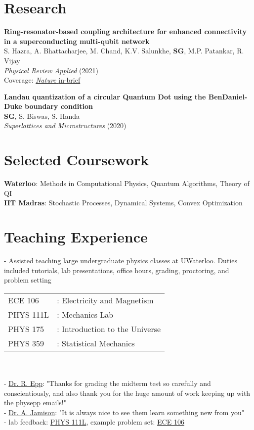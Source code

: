 \documentclass[margin,line]{res}
\begin{document}
\begin{resume}
\section{\sc Research}
{\bf Ring-resonator-based coupling architecture for enhanced connectivity in a superconducting multi-qubit network} \href{https://journals.aps.org/prapplied/abstract/10.1103/PhysRevApplied.16.024018?ft=1}{\sf[doi]}\\
S. Hazra, A. Bhattacharjee, M. Chand, K.V. Salunkhe, {\bf SG}, M.P. Patankar, R. Vijay\\
\emph{Physical Review Applied} (2021)\\
Coverage: \href{https://www.nature.com/articles/s41578-021-00373-1}{\emph{Nature} \textsf{in-brief}}


{\bf Landau quantization of a circular Quantum Dot using the BenDaniel-Duke boundary condition} \href{https://doi.org/10.1016/j.spmi.2020.106693}{\sf[doi]}\\
{\bf SG}, S. Biswas, S. Handa\\
\emph{Superlattices and Microstructures} (2020)

\section{\sc Selected Coursework}
{\bf Waterloo}: Methods in Computational Physics, Quantum Algorithms, Theory of QI\\
{\bf IIT Madras}: Stochastic Processes, Dynamical Systems, Convex Optimization

\section{\sc Teaching Experience}
- Assisted teaching large undergraduate physics classes at UWaterloo. Duties included tutorials, lab presentations, office hours, grading, proctoring, and problem setting\\
\begin{tabular}{ll}
    \textsf{ECE 106} & : Electricity and Magnetism \\
    \textsf{PHYS 111L} & : Mechanics Lab \\
    \textsf{PHYS 175} & : Introduction to the Universe \\
    \textsf{PHYS 359} & : Statistical Mechanics 
\end{tabular}\\\\
- \href{https://uwaterloo.ca/astrophysics-centre/people-profiles/richard-epp}{\sffamily Dr. R. Epp}: "Thanks for grading the midterm test so carefully and conscientiously, and also thank you for the huge amount of work keeping up with the physepp emails!"\\
- \href{https://uwaterloo.ca/physics-astronomy/profile/alanj}{\sffamily Dr. A. Jamison}: "It is always nice to see them learn something new from you"\\
- lab feedback: \href{https://sriramgkn.github.io/docs/phys111L_feedback.pdf}{\sffamily PHYS 111L}, example problem set: \href{https://sriramgkn.github.io/docs/ECE106_Problems.pdf}{\sffamily ECE 106}


\end{resume}
\end{document}
